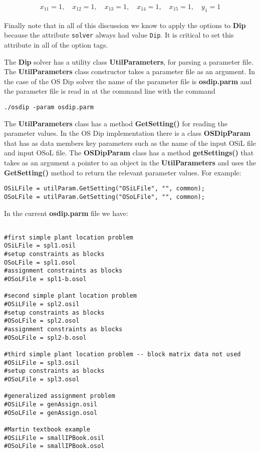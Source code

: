 \begin{eqnarray*}
x_{11} = 1, \quad  x_{12} = 1, \quad  x_{13} = 1, \quad  x_{14} = 1, \quad
x_{15} = 1, \quad y_{1} = 1
\end{eqnarray*}


Finally note that in all of this discussion we know to apply the options to {\bf
Dip} because the attribute {\tt solver} always had value {\tt Dip}. It is
critical to set this attribute in all of the option tags. 


\label{section:parameterfile}

The {\bf Dip} solver has a utility class {\bf UtilParameters},  for parsing
a parameter file. The {\bf UtilParameters} class constructor takes a parameter
file as an argument. In the case of the OS Dip solver the name of the parameter
file is {\bf osdip.parm} and the parameter file is read in at the command line with
the command

\begin{verbatim}
./osdip -param osdip.parm
\end{verbatim}

The {\bf UtilParameters} class has a method {\bf GetSetting()} for reading the
parameter values. In the OS Dip implementation there is a class {\bf OSDipParam}
that has as data members key parameters such as the name of the input OSiL file
and input OSoL file. The {\bf OSDipParam} class has a method
{\bf getSettings()} that takes as an argument a pointer to an object in the {\bf
UtilParameters} and uses the {\bf GetSetting()} method to return the relevant
parameter values. For example:

\begin{verbatim}
OSiLFile = utilParam.GetSetting("OSiLFile", "", common); 
OSoLFile = utilParam.GetSetting("OSoLFile", "", common);
\end{verbatim}

In the current {\bf osdip.parm} file we have:

\begin{verbatim}

#first simple plant location problem
OSiLFile = spl1.osil
#setup constraints as blocks
OSoLFile = spl1.osol
#assignment constraints as blocks
#OSoLFile = spl1-b.osol

#second simple plant location problem
#OSiLFile = spl2.osil
#setup constraints as blocks
#OSoLFile = spl2.osol
#assignment constraints as blocks
#OSoLFile = spl2-b.osol

#third simple plant location problem -- block matrix data not used
#OSiLFile = spl3.osil
#setup constraints as blocks
#OSoLFile = spl3.osol

#generalized assignment problem
#OSiLFile = genAssign.osil
#OSoLFile = genAssign.osol

#Martin textbook example
#OSiLFile = smallIPBook.osil
#OSoLFile = smallIPBook.osol
\end{verbatim}
 
